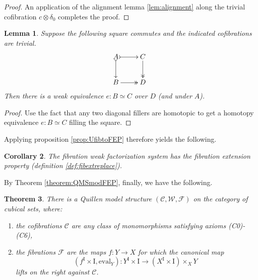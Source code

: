 \documentclass[12pt]{article}
\newcommand{\CC}{\ensuremath{\mathcal{C}}}
\newcommand{\WW}{\ensuremath{\mathcal{W}}}
\newcommand{\FF}{\ensuremath{\mathcal{F}}}
\newcommand{\ra}{\ensuremath{\rightarrow}}
\newcommand{\I}{\ensuremath{\mathrm{I}}}
\newtheorem{theorem}{Theorem}
\newtheorem{lemma}[theorem]{Lemma}
\newtheorem{corollary}[theorem]{Corollary}
\theoremstyle{remark}
\theoremstyle{definition}
\begin{document}
\begin{proof}
An application of the alignment lemma \ref{lem:alignment} along the trivial cofibration $c\otimes \delta_0$ completes the proof.
\end{proof}

\begin{lemma}\label{lem:simple}
Suppose the following square commutes and the indicated cofibrations are trivial.
\begin{equation}\label{diag:standard1}
\xymatrix{
A \ar@{>->}[d] \ar@{>->}[r] & C \ar@{>>}[d] \\
B  \ar@{>>}[r] &  D \\
}
\end{equation}
Then there is a weak equivalence $e : B \simeq C$ over $D$ (and under $A$).
\end{lemma}
\begin{proof}
Use the fact that any two diagonal fillers are homotopic to get a homotopy equivalence $e : B \simeq C$ filling the square.
\end{proof}

Applying proposition \ref{prop:UfibtoFEP} therefore yields the following.

\begin{corollary}
The fibration weak factorization system has the fibration extension property (definition \ref{def:fibextreplace}). 
\end{corollary}

By Theorem \ref{theorem:QMSmodFEP}, finally, we have the following.

\begin{theorem}\label{theorem:QMS}
There is a Quillen model structure $(\CC,\WW,\FF)$ on the category of cubical sets, where:
\begin{enumerate}
\item the cofibrations $\CC$ are any class of monomorphisms satisfying axioms (C0)-(C6),
\item the fibrations $\FF$ are the maps $f : Y\ra X$ for which the canonical map 
\[
(f^\I \times \I, \mathrm{eval}_Y) : Y^\I \times \I\ra (X^\I \times \I)\times_X Y
\]
lifts on the right against $\CC$.
\end{enumerate}
\end{theorem}

%


%

\end{document}

